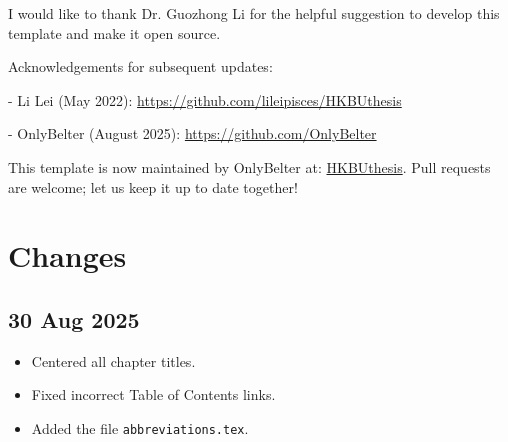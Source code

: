 I would like to thank Dr. Guozhong Li for the helpful suggestion to develop this template and make it open source.

Acknowledgements for subsequent updates:

- Li Lei (May 2022): \href{https://github.com/lileipisces/HKBUthesis}{https://github.com/lileipisces/HKBUthesis}

- OnlyBelter (August 2025): \href{https://github.com/OnlyBelter}{https://github.com/OnlyBelter}

\vspace{1cm}

This template is now maintained by OnlyBelter at: \href{https://github.com/OnlyBelter/HKBUthesis}{HKBUthesis}. Pull requests are welcome; let us keep it up to date together!

\section*{Changes}
\subsection*{30 Aug 2025}
\begin{itemize}
    \item Centered all chapter titles.
    \item Fixed incorrect Table of Contents links.
    \item Added the file \texttt{abbreviations.tex}.
\end{itemize}